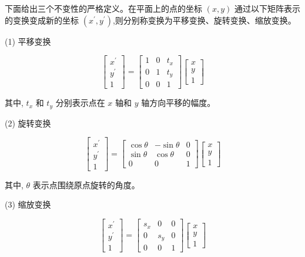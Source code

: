 \documentclass[10pt]{article}
\begin{document}
下面给出三个不变性的严格定义。在平面上的点的坐标 $(x, y)$ 通过以下矩阵表示的变换变成新的坐标 $\left(x^{\prime}, y^{\prime}\right)$,则分别称变换为平移变换、旋转变换、缩放变换。

(1) 平移变换

$$
\left[\begin{array}{c}
x^{\prime} \\
y^{\prime} \\
1
\end{array}\right]=\left[\begin{array}{lll}
1 & 0 & t_{x} \\
0 & 1 & t_{y} \\
0 & 0 & 1
\end{array}\right]\left[\begin{array}{l}
x \\
y \\
1
\end{array}\right]
$$

其中, $t_{x}$ 和 $t_{y}$ 分别表示点在 $x$ 轴和 $y$ 轴方向平移的幅度。

(2) 旋转变换

$$
\left[\begin{array}{c}
x^{\prime} \\
y^{\prime} \\
1
\end{array}\right]=\left[\begin{array}{ccc}
\cos \theta & -\sin \theta & 0 \\
\sin \theta & \cos \theta & 0 \\
0 & 0 & 1
\end{array}\right]\left[\begin{array}{l}
x \\
y \\
1
\end{array}\right]
$$

其中, $\theta$ 表示点围绕原点旋转的角度。

(3) 缩放变换

$$
\left[\begin{array}{c}
x^{\prime} \\
y^{\prime} \\
1
\end{array}\right]=\left[\begin{array}{ccc}
s_{x} & 0 & 0 \\
0 & s_{y} & 0 \\
0 & 0 & 1
\end{array}\right]\left[\begin{array}{l}
x \\
y \\
1
\end{array}\right]
$$
\end{document}
